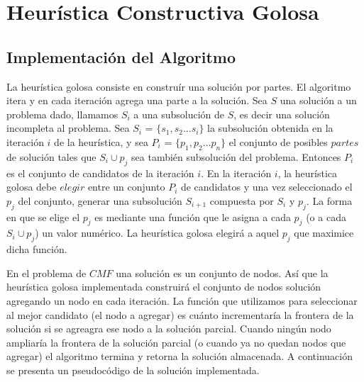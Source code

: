 \section{Heurística Constructiva Golosa}
\subsection{Implementación del Algoritmo}

\par{La heurística golosa consiste en construír una solución por partes. El
algoritmo itera y en cada iteración agrega una parte a la solución. Sea $S$
una solución a un problema dado, llamamos $S_i$ a una subsolución de $S$, es
decir una solución incompleta al problema. Sea $S_i$ = $\{s_1, s_2\dots s_i\}$
la subsolución obtenida en la iteración $i$ de la heurística, y sea $P_i$ =
$\{p_1, p_2\dots p_n\}$ el conjunto de posibles $partes$ de solución tales que
$S_i \cup p_j$ sea también subsolución del problema. Entonces $P_i$ es el
conjunto de candidatos de la iteración $i$. En la iteración $i$, la heurística
golosa debe $elegir$ entre un conjunto $P_i$ de candidatos y una vez
seleccionado el $p_j$ del conjunto, generar una subsolución $S_{i+1}$ compuesta
por $S_i$ y $p_j$. La forma en que se elige el $p_j$ es mediante una función
que le asigna a cada $p_j$ (o a cada $S_i \cup p_j$) un valor numérico. La
heurística golosa elegirá a aquel $p_j$ que maximice dicha función.}\\

\par{En el problema de $CMF$ una solución es un conjunto de nodos. Así que la
heurística golosa implementada construirá el conjunto de nodos solución
agregando un nodo en cada iteración. La función que utilizamos para
seleccionar al mejor candidato (el nodo a agregar) es cuánto incrementaría la
frontera de la solución si se agreagra ese nodo a la solución parcial. Cuando
ningún nodo ampliaría la frontera de la solución parcial (o cuando ya no quedan
nodos que agregar) el algoritmo termina y retorna la solución almacenada. A
continuación se presenta un pseudocódigo de la solución implementada.}\\

